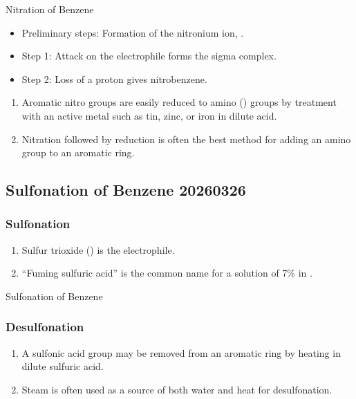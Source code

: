 \begin{mechanism}
    Nitration of Benzene
    \begin{itemize}
        \item Preliminary steps: Formation of the nitronium ion, .
        \item Step 1: Attack on the electrophile forms the sigma complex.
        \item Step 2: Loss of a proton gives nitrobenzene.
    \end{itemize}
\end{mechanism}

\begin{enumerate}[resume]
    \item Aromatic nitro groups are easily reduced to amino () groups by treatment with an active metal such as tin, zinc, or iron in dilute acid.
    \item Nitration followed by reduction is often the best method for adding an amino group to an aromatic ring.
\end{enumerate}

\subsection{Sulfonation of Benzene 20260326}

\subsubsection{Sulfonation}

\begin{enumerate}
    \item Sulfur trioxide () is the electrophile.
    \item “Fuming sulfuric acid” is the common name for a solution of 7\%  in .
\end{enumerate}

\begin{mechanism}
    Sulfonation of Benzene
\end{mechanism}

\subsubsection{Desulfonation}

\begin{enumerate}
    \item A sulfonic acid group may be removed from an aromatic ring by heating in dilute sulfuric acid.
    \item Steam is often used as a source of both water and heat for desulfonation.
\end{enumerate}

